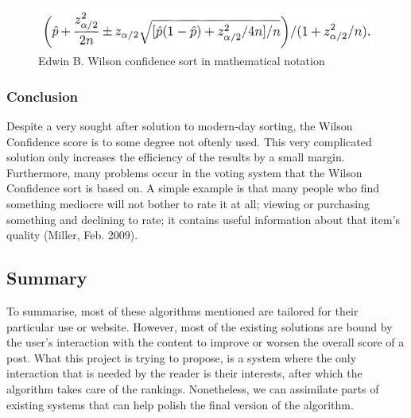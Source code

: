 \begin{figure} [!htb]
  \centering
	\includegraphics[scale=0.5]{Figures/wilson_confidence}
\caption{Edwin B. Wilson confidence sort in mathematical notation}
\end{figure}

\subsubsection{Conclusion}
Despite a very sought after solution to modern-day sorting, the Wilson Confidence score is to some degree not oftenly used. This very complicated solution only increases the efficiency of the results by a small margin. Furthermore, many problems occur in the voting system that the Wilson Confidence sort is based on. A simple example is that many people who find something mediocre will not bother to rate it at all; viewing or purchasing something and declining to rate; it contains useful information about that item's quality (Miller, Feb. 2009).

\subsection{Summary}
To summarise, most of these algorithms mentioned are tailored for their particular use or website. However, most of the existing solutions are bound by the user's interaction with the content to improve or worsen the overall score of a post. What this project is trying to propose, is a system where the only interaction that is needed by the reader is their interests, after which the algorithm takes care of the rankings. Nonetheless, we can assimilate parts of existing systems that can help polish the final version of the algorithm.
